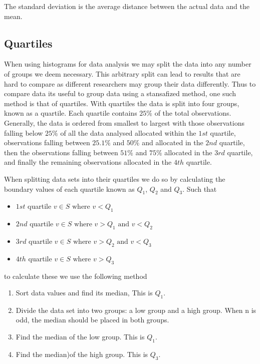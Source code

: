 The standard deviation is the average distance between the actual data and the mean.

\subsection{Quartiles}
When using histograms for data analysis we may split the data into any number of groups we deem necessary. This arbitrary split can lead to results that are hard to compare as different researchers may group their data differently. Thus to compare data its useful to group data using a stansafized method, one such method is that of quartiles. With quartiles the data is split into four groups, known as a quartile. Each quartile contains $25\%$ of the total observations. Generally, the data is ordered from smallest to largest with those observations falling below $25\%$ of all the data analysed allocated within the $1st$ quartile, observations falling between $25.1\%$ and $50\%$ and allocated in the $2nd$ quartile, then the observations falling between $51\%$ and $75\%$ allocated in the $3rd$ quartile, and finally the remaining observations allocated in the $4th$ quartile.

When splitting data sets into their quartiles we do so by calculating the boundary values of each quartile known as $Q_1$, $Q_2$ and $Q_3$. Such that

\begin{itemize}
\item $1st$ quartile $v \in S \text{ where } v < Q_1$
\item $2nd$ quartile $v \in S \text{ where } v > Q_1 \text{ and } v < Q_2$
\item $3rd$ quartile $v \in S \text{ where } v > Q_2 \text{ and } v < Q_3$
\item $4th$ quartile $v \in S \text{ where } v > Q_3$
\end{itemize}

to calculate these we use the following method
\begin{enumerate}\label{stat:quartiles}
    \item Sort data values and find its median, This is $Q_1$.
    \item Divide the data set into two groups: a low group and a high group. When n is odd, the median should be placed in both groups.
    \item Find the median of the low group. This is $Q_1$.
    \item Find the median)of the high group. This is $Q_3$.
\end{enumerate}

